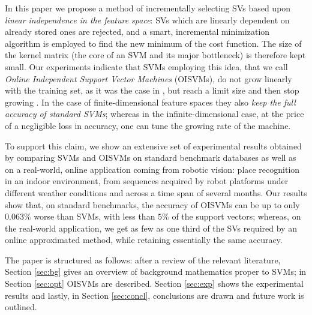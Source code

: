 In this paper we propose a method of incrementally selecting SVs based
upon \emph{linear independence in the feature space}: SVs which are
linearly dependent on already stored ones are rejected, and a smart,
incremental minimization algorithm is employed to find the new minimum
of the cost function. The size of the kernel matrix (the core of an
SVM and its major bottleneck) is therefore kept small. Our experiments
indicate that SVMs employing this idea, that we call
\emph{Online Independent Support Vector Machines} (OISVMs), do not
grow linearly with the training set, as it was the case in
\cite{Steinwart03}, but reach a limit size and then stop growing
\cite{engel2004}. In the case of finite-dimensional feature spaces
they also \emph{keep the full accuracy of standard SVMs}; whereas in
the infinite-dimensional case, at the price of a negligible loss in
accuracy, one can tune the growing rate of the machine.

To support this claim, we show an extensive set of experimental
results obtained by comparing SVMs and OISVMs on standard benchmark
databases as well as on a real-world, online application coming from
robotic vision: place recognition in an indoor environment, from
sequences acquired by robot platforms under different weather
conditions and across a time span of several months. Our results show
that, on standard benchmarks, the accuracy of OISVMs can be up to only
$0.063\%$ worse than SVMs, with less than $5\%$ of the support
vectors; whereas, on the real-world application, we get as few as one
third of the SVs required by an online approximated method, while
retaining essentially the same accuracy.

The paper is structured as follows: after a review of the relevant
literature, Section \ref{sec:bg} gives an overview of background
mathematics proper to SVMs; in Section \ref{sec:opt} OISVMs are
described.  Section \ref{sec:exp}  shows the experimental results
and lastly, in Section \ref{sec:concl}, conclusions are drawn and future
work is outlined.
